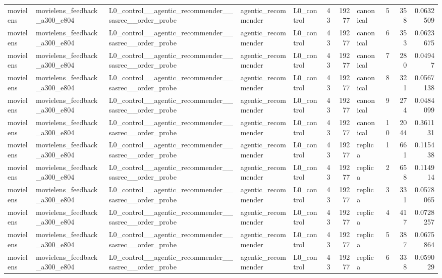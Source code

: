 \begin{table}[htbp!]
\begin{tabular}{lllllrrlrrr}
movielens & movielens\_feedback\_a300\_e804 & L0\_control\_\_agentic\_recommender\_\_sasrec\_\_order\_probe & agentic\_recommender & L0\_control & 43 & 19277 & canonical & 5 & 358 & 0.0632509 \\
movielens & movielens\_feedback\_a300\_e804 & L0\_control\_\_agentic\_recommender\_\_sasrec\_\_order\_probe & agentic\_recommender & L0\_control & 43 & 19277 & canonical & 6 & 353 & 0.0623675 \\
movielens & movielens\_feedback\_a300\_e804 & L0\_control\_\_agentic\_recommender\_\_sasrec\_\_order\_probe & agentic\_recommender & L0\_control & 43 & 19277 & canonical & 7 & 280 & 0.04947 \\
movielens & movielens\_feedback\_a300\_e804 & L0\_control\_\_agentic\_recommender\_\_sasrec\_\_order\_probe & agentic\_recommender & L0\_control & 43 & 19277 & canonical & 8 & 321 & 0.0567138 \\
movielens & movielens\_feedback\_a300\_e804 & L0\_control\_\_agentic\_recommender\_\_sasrec\_\_order\_probe & agentic\_recommender & L0\_control & 43 & 19277 & canonical & 9 & 274 & 0.0484099 \\
movielens & movielens\_feedback\_a300\_e804 & L0\_control\_\_agentic\_recommender\_\_sasrec\_\_order\_probe & agentic\_recommender & L0\_control & 43 & 19277 & canonical & 10 & 2044 & 0.361131 \\
movielens & movielens\_feedback\_a300\_e804 & L0\_control\_\_agentic\_recommender\_\_sasrec\_\_order\_probe & agentic\_recommender & L0\_control & 43 & 19277 & replica & 1 & 661 & 0.115438 \\
movielens & movielens\_feedback\_a300\_e804 & L0\_control\_\_agentic\_recommender\_\_sasrec\_\_order\_probe & agentic\_recommender & L0\_control & 43 & 19277 & replica & 2 & 658 & 0.114914 \\
movielens & movielens\_feedback\_a300\_e804 & L0\_control\_\_agentic\_recommender\_\_sasrec\_\_order\_probe & agentic\_recommender & L0\_control & 43 & 19277 & replica & 3 & 331 & 0.0578065 \\
movielens & movielens\_feedback\_a300\_e804 & L0\_control\_\_agentic\_recommender\_\_sasrec\_\_order\_probe & agentic\_recommender & L0\_control & 43 & 19277 & replica & 4 & 417 & 0.0728257 \\
movielens & movielens\_feedback\_a300\_e804 & L0\_control\_\_agentic\_recommender\_\_sasrec\_\_order\_probe & agentic\_recommender & L0\_control & 43 & 19277 & replica & 5 & 387 & 0.0675864 \\
movielens & movielens\_feedback\_a300\_e804 & L0\_control\_\_agentic\_recommender\_\_sasrec\_\_order\_probe & agentic\_recommender & L0\_control & 43 & 19277 & replica & 6 & 338 & 0.059029 \\

\end{tabular}
\end{table}

